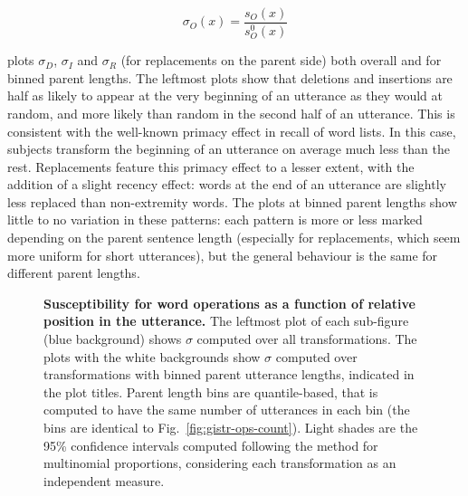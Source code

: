 \documentclass[a4paper,fleqn]{cas-dc}
\begin{document}
\[\sigma_O(x) = \frac{s_O(x)}{s_O^0(x)}\]

 plots \(\sigma_D\), \(\sigma_I\) and
\(\sigma_R\) (for replacements on the parent side) both overall and for
binned parent lengths. The leftmost plots show that deletions and
insertions are half as likely to appear at the very beginning of an
utterance as they would at random, and more likely than random in the
second half of an utterance. This is consistent with the well-known
primacy effect in recall of word lists. In this case, subjects transform
the beginning of an utterance on average much less than the rest.
Replacements feature this primacy effect to a lesser extent, with the
addition of a slight recency effect: words at the end of an utterance
are slightly less replaced than non-extremity words. The plots at binned
parent lengths show little to no variation in these patterns: each
pattern is more or less marked depending on the parent sentence length
(especially for replacements, which seem more uniform for short
utterances), but the general behaviour is the same for different parent
lengths.

\begin{figure}
  \centering


  \caption[Susceptibility for word operations as a function of relative position in the utterance]{
  \textbf{Susceptibility for word operations as a function of relative position in the utterance.}
  The leftmost plot of each sub-figure (blue background) shows $\sigma$ computed over all transformations.
  The plots with the white backgrounds show $\sigma$ computed over transformations with binned parent utterance lengths, indicated in the plot titles.
  Parent length bins are quantile-based, that is computed to have the same number of utterances in each bin (the bins are identical to Fig.~\ref{fig:gistr-ops-count}).
  Light shades are the 95\% confidence intervals computed following the \citet{goodman_simultaneous_1965} method for multinomial proportions, considering each transformation as an independent measure.
  }
  \label{fig:gistr-susc-ops}
\end{figure}
\end{document}
